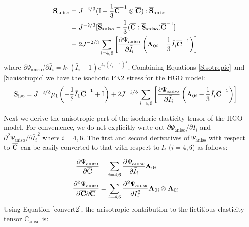 \begin{equation} \label{Sanisotropic}
\begin{split}
\bold{S}_\mathrm{aniso}
&= J^{-2/3}(\mathbb{I} - \frac{1}{3}{\overline{\bold{C}}}^{-1} \otimes \overline{\bold{C}}) : \overline{\bold{S}}_\mathrm{aniso} \\
&= J^{-2/3}[\overline{\bold{S}}_\mathrm{aniso} - \frac{1}{3}(\overline{\bold{C}} : \overline{\bold{S}}_\mathrm{aniso}){\overline{\bold{C}}}^{-1}] \\
&= 2J^{-2/3} \sum_{i = 4, 6}\left[\frac{\partial{\Psi_\mathrm{aniso}}}{\partial{\bar{I}_i}}  \left(\bold{A}_{0i} - \frac{1}{3}\bar{I}_i\overline{\bold{C}}^{-1}\right)\right]
\end{split}
\end{equation}
where
${\partial\Psi_\mathrm{aniso}}/{\partial{\bar{I}_i}} = k_1(\bar{I}_i - 1)e^{k_2(\bar{I}_i - 1)^2}$.
Combining Equations \ref{Sisotropic} and \ref{Sanisotropic} we have the isochoric PK2 stress for the HGO model:
\begin{equation} \label{HGOSiso}
\bold{S}_\mathrm{iso} 
= J^{-2/3}\mu_1 \left( -\frac{1}{3}\bar{I}_1\overline{\bold{C}}^{-1} + \bold{I} \right) 
+2J^{-2/3} \sum_{i = 4, 6} \left[ \frac{\partial{\Psi_\mathrm{aniso}}}{\partial{\bar{I}_i}}  \left(\bold{A}_{0i} - \frac{1}{3}\bar{I}_i\overline{\bold{C}}^{-1} \right) \right]
\end{equation}

Next we derive the anisotropic part of the isochoric elasticity tensor of the HGO model. For convenience, we do not explicitly write out ${\partial\Psi_\mathrm{aniso}}/{\partial{\bar{I}_i}}$ and $\partial^2{\Psi_\mathrm{aniso}}/\partial{\bar{I}_i}^2$ where $i = 4, 6$. The first and second derivatives of $\Psi_\mathrm{aniso}$ with respect to $\overline{\bold{C}}$ can be easily converted to that with respect to $\bar{I}_{i}$ ($i = 4, 6$) as follows:

\begin{subequations} \label{convert}
\begin{align}
\frac{\partial\Psi_\mathrm{aniso}}{\partial\overline{\bold{C}}} 
&= \sum_{i = 4, 6}\frac{\partial\Psi_\mathrm{aniso}}{\partial\bar{I}_i}\bold{A}_{0i} \label{convert1} \\
\frac{\partial^2\Psi_\mathrm{aniso}}{\partial{\overline{\bold{C}}}\partial{\overline{\bold{C}}}} 
&= \sum_{i = 4, 6}\frac{\partial^2\Psi_\mathrm{aniso}}{\partial{\bar{I}_i}^2}\bold{A}_{0i} \otimes \bold{A}_{0i} \label{convert2}
\end{align}
\end{subequations}
Using Equation \ref{convert2}, the anisotropic contribution to the fictitious elasticity tensor $\overline{\mathbb{C}}_\mathrm{aniso}$ is:

